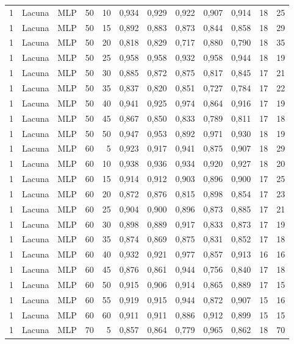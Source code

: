 \begin{longtable}{@{}rllrrrrrrrrr@{}}
1 & Lacuna & MLP & 50 & 10 & 0,934 & 0,929 & 0,922 & 0,907 & 0,914 & 18 & 25 \\
1 & Lacuna & MLP & 50 & 15 & 0,892 & 0,883 & 0,873 & 0,844 & 0,858 & 18 & 29 \\
1 & Lacuna & MLP & 50 & 20 & 0,818 & 0,829 & 0,717 & 0,880 & 0,790 & 18 & 35 \\
1 & Lacuna & MLP & 50 & 25 & 0,958 & 0,958 & 0,932 & 0,958 & 0,944 & 18 & 19 \\
1 & Lacuna & MLP & 50 & 30 & 0,885 & 0,872 & 0,875 & 0,817 & 0,845 & 17 & 21 \\
1 & Lacuna & MLP & 50 & 35 & 0,837 & 0,820 & 0,851 & 0,727 & 0,784 & 17 & 22 \\
1 & Lacuna & MLP & 50 & 40 & 0,941 & 0,925 & 0,974 & 0,864 & 0,916 & 17 & 19 \\
1 & Lacuna & MLP & 50 & 45 & 0,867 & 0,850 & 0,833 & 0,789 & 0,811 & 17 & 18 \\
1 & Lacuna & MLP & 50 & 50 & 0,947 & 0,953 & 0,892 & 0,971 & 0,930 & 18 & 19 \\
1 & Lacuna & MLP & 60 & 5 & 0,923 & 0,917 & 0,941 & 0,875 & 0,907 & 18 & 29 \\
1 & Lacuna & MLP & 60 & 10 & 0,938 & 0,936 & 0,934 & 0,920 & 0,927 & 18 & 20 \\
1 & Lacuna & MLP & 60 & 15 & 0,914 & 0,912 & 0,903 & 0,896 & 0,900 & 17 & 25 \\
1 & Lacuna & MLP & 60 & 20 & 0,872 & 0,876 & 0,815 & 0,898 & 0,854 & 17 & 23 \\
1 & Lacuna & MLP & 60 & 25 & 0,904 & 0,900 & 0,896 & 0,873 & 0,885 & 17 & 21 \\
1 & Lacuna & MLP & 60 & 30 & 0,898 & 0,889 & 0,917 & 0,833 & 0,873 & 17 & 19 \\
1 & Lacuna & MLP & 60 & 35 & 0,874 & 0,869 & 0,875 & 0,831 & 0,852 & 17 & 18 \\
1 & Lacuna & MLP & 60 & 40 & 0,932 & 0,921 & 0,977 & 0,857 & 0,913 & 16 & 16 \\
1 & Lacuna & MLP & 60 & 45 & 0,876 & 0,861 & 0,944 & 0,756 & 0,840 & 17 & 18 \\
1 & Lacuna & MLP & 60 & 50 & 0,915 & 0,906 & 0,914 & 0,865 & 0,889 & 17 & 15 \\
1 & Lacuna & MLP & 60 & 55 & 0,919 & 0,915 & 0,944 & 0,872 & 0,907 & 15 & 16 \\
1 & Lacuna & MLP & 60 & 60 & 0,911 & 0,911 & 0,886 & 0,912 & 0,899 & 15 & 15 \\
1 & Lacuna & MLP & 70 & 5 & 0,857 & 0,864 & 0,779 & 0,965 & 0,862 & 18 & 70 \\

\end{longtable}
